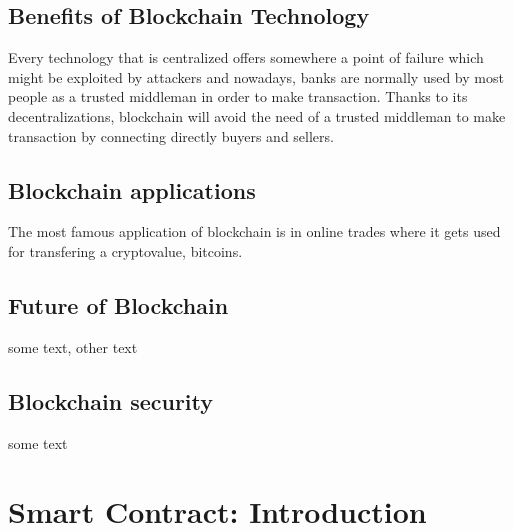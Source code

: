 \subsection{Benefits of Blockchain Technology}
Every technology that is centralized offers somewhere a point of failure which might be exploited by attackers and nowadays, banks are normally used by most people as a trusted middleman in order to make transaction.
Thanks to its decentralizations, blockchain will avoid the need of a trusted middleman to make transaction by connecting directly buyers and sellers.

\subsection{Blockchain applications}
The most famous application of blockchain is in online trades where it gets used for transfering a cryptovalue, bitcoins.


\subsection{Future of Blockchain}
some text\cite{blockchain9}, other text \cite{blockchain10}

\subsection{Blockchain security}
some text\cite{blockchain11}


\section{Smart Contract: Introduction}
